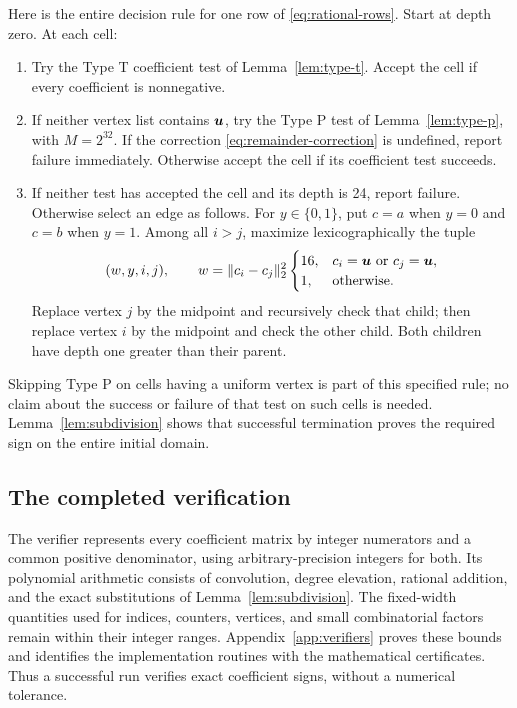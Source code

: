 Here is the entire decision rule for one row of \eqref{eq:rational-rows}.
Start at depth zero.  At each cell:
\begin{enumerate}
\item Try the Type T coefficient test of Lemma~\ref{lem:type-t}.  Accept the
cell if every coefficient is nonnegative.
\item If neither vertex list contains $\boldsymbol u$, try the Type P test of
Lemma~\ref{lem:type-p}, with $M=2^{32}$.  If the correction
\eqref{eq:remainder-correction} is undefined, report failure immediately.
Otherwise accept the cell if its coefficient test succeeds.
\item If neither test has accepted the cell and its depth is 24, report
failure.  Otherwise select an edge as follows.  For $y\in\{0,1\}$, put
$c=a$ when $y=0$ and $c=b$ when $y=1$.  Among all $i>j$, maximize
lexicographically the tuple
\[
 (w,y,i,j),\qquad
 w=\|c_i-c_j\|_2^2
 \begin{cases}
 16,&c_i=\boldsymbol u\text{ or }c_j=\boldsymbol u,\\
 1,&\text{otherwise}.
 \end{cases}
\]
Replace vertex $j$ by the midpoint and recursively check that child; then
replace vertex $i$ by the midpoint and check the other child.  Both children
have depth one greater than their parent.
\end{enumerate}
Skipping Type P on cells having a uniform vertex is part of this specified
rule; no claim about the success or failure of that test on such cells is
needed.  Lemma~\ref{lem:subdivision} shows that successful termination proves
the required sign on the entire initial domain.

\subsection{The completed verification}

The verifier represents every coefficient matrix by integer numerators and
a common positive denominator, using arbitrary-precision integers for both.
Its polynomial arithmetic consists of convolution, degree elevation,
rational addition, and the exact substitutions of
Lemma~\ref{lem:subdivision}.  The fixed-width quantities used for indices,
counters, vertices, and small combinatorial factors remain within their integer
ranges.  Appendix~\ref{app:verifiers} proves these bounds and identifies
the implementation routines with the mathematical certificates.  Thus a
successful run verifies exact coefficient signs, without a numerical
tolerance.


